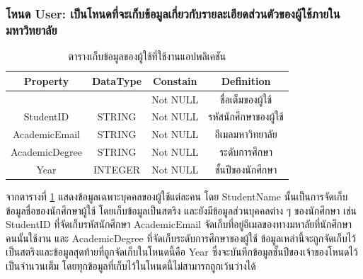 \documentclass[14pt,oneside,openright,a4paper]{cpe-thai-project}
\begin{document}
    \subsubsection{โหนด User: เป็นโหนดที่จะเก็บข้อมูลเกี่ยวกับรายละเอียดส่วนตัวของผู้ใช้ภายในมหาวิทยาลัย}
    \begin{table}[!h]\centering
      \begin{tabular}{|c|c|c|c|}
      \hline
      \rowcolor[HTML]{9FC5E8} 
      Property       & {\color[HTML]{242424} DataType} & Constain & Definition            \\ \hline
      \cellcolor[HTML]{FFFFFF}{\color[HTML]{242424} StudentName} & \cellcolor[HTML]{FFFFFF}{\color[HTML]{242424} STRING} & Not NULL & ชื่อเต็มของผู้ใช้ \\ \hline
      StudentID      & STRING                          & Not NULL & รหัสนักศึกษาของผู้ใช้ \\ \hline
      AcademicEmail  & STRING                          & Not NULL & อีเมลมหาวิทยาลัย      \\ \hline
      AcademicDegree & STRING                          & Not NULL & ระดับการศึกษา         \\ \hline
      Year           & INTEGER                         & Not NULL & ชั้นปีของนักศึกษา     \\ \hline
      \end{tabular}
      \caption{\centering ตารางเก็บข้อมูลของผู้ใช้ที่ใช้งานแอปพลิเคชัน}\label{tab:User Node}
    \end{table}
    จากตารางที่ \ref{tab:User Node} แสดงข้อมูลเฉพาะบุคคลของผู้ใช้แต่ละคน โดย StudentName นั้นเป็นการจัดเก็บข้อมูลชื่อของนักศึกษาผู้ใช้ โดยเก็บข้อมูลเป็นสตริง และยังมีข้อมูลส่วนบุคคลต่าง ๆ ของนักศึกษา เช่น StudentID ที่จัดเก็บรหัสนักศึกษา AcademicEmail จัดเก็บที่อยู่อีเมลของทางมหาลัยที่นักศึกษาคนนั้นใช้งาน และ AcademicDegree ที่จัดเก็บระดับการศึกษาของผู้ใช้ ข้อมูลเหล่านี้จะถูกจัดเก็บไว้เป็นสตริงและข้อมูลสุดท้ายที่ถูกจัดเก็บในโหนดนี้คือ Year ซึ่งจะบันทึกข้อมูลชั้นปีของเจ้าของโหนดไว้เป็นจำนวนเต็ม โดยทุกข้อมูลที่เก็บไว้ในโหนดนี้ไม่สามารถถูกเว้นว่างได้
\end{document}
